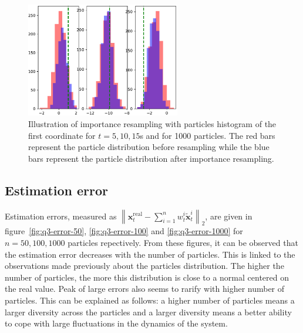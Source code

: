 \documentclass[english, DIV=13]{scrartcl}
\newcommand\norm[1]{\left\lVert#1\right\rVert}
\begin{document}
\begin{figure}
    \centering
    \includegraphics[width=0.6\textwidth]{figures/hist-irs-1000}
    \caption{Illustration of importance resampling with particles histogram of the first coordinate
    for $t=5, 10, 15$s and for 1000 particles. The red bars represent the particle distribution
    before resampling while the blue bars represent the particle distribution after importance
    resampling.}
    \label{fig:irs}
\end{figure}

\subsection{Estimation error}
Estimation errors, measured as 
$\norm{\mathbf{x}_t^{\text{real}} - \sum_{i=1}^n w_t^i\tilde{\mathbf{x}}_t^i}_2$,
are given in figure~\ref{fig:q3-error-50}, \ref{fig:q3-error-100} and
\ref{fig:q3-error-1000} for $n = 50, 100, 1000$ particles repectively.
From these figures, it can be observed that the estimation error decreases with the
number of particles. This is linked to the observations made previously about the
particles distribution. The higher the number of particles, the more this distribution
is close to a normal centered on the real value. Peak of large errors also seems to
rarify with higher number of particles. This can be explained as follows: a higher
number of particles means a larger diversity across the particles and a larger diversity
means a better ability to cope with large fluctuations in the dynamics of the system.
\end{document}
